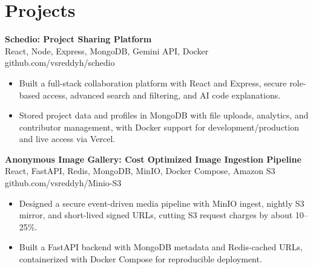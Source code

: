 \documentclass[a4paper,11pt]{article}
\newcommand{\resumeItem}[1]{\item \small{#1}}
\newcommand{\resumeSubheading}[4]{%
  \textbf{#1} \hfill \textbf{#2} \\
{#3} \hfill {#4}
}
\newcommand{\resumeSubHeadingListStart}{\begin{itemize}}
\newcommand{\resumeSubHeadingListEnd}{\end{itemize}}
\begin{document}
\section*{Projects}

\resumeSubheading
{Schedio: Project Sharing Platform}{}{React, Node, Express, MongoDB, Gemini API, Docker}{github.com/vsreddyh/schedio}
\resumeSubHeadingListStart
\resumeItem{Built a full-stack collaboration platform with React and Express, secure role-based access, advanced search and filtering, and AI code explanations.}
\resumeItem{Stored project data and profiles in MongoDB with file uploads, analytics, and contributor management, with Docker support for development/production and live access via Vercel.}
\resumeSubHeadingListEnd

\resumeSubheading
{Anonymous Image Gallery: Cost Optimized Image Ingestion Pipeline}{}{React, FastAPI, Redis, MongoDB, MinIO, Docker Compose, Amazon S3}{github.com/vsreddyh/Minio-S3}
\resumeSubHeadingListStart
\resumeItem{Designed a secure event-driven media pipeline with MinIO ingest, nightly S3 mirror, and short-lived signed URLs, cutting S3 request charges by about 10--25\%.}
\resumeItem{Built a FastAPI backend with MongoDB metadata and Redis-cached URLs, containerized with Docker Compose for reproducible deployment.}
\resumeSubHeadingListEnd


\vspace{-0.6em}
\end{document}
